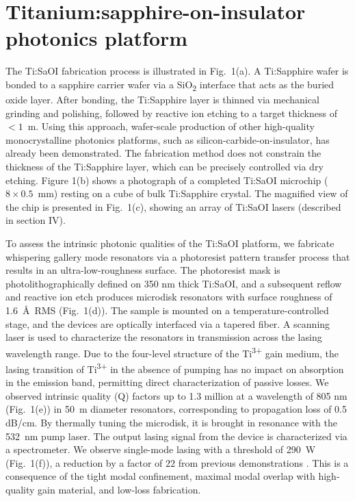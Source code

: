 \documentclass[amsmath, amsthm, amssymb, aps, prb, superscriptaddress, twocolumn, nofootinbib, 10pt]{revtex4-1}%
\begin{document}
\section{Titanium:sapphire-on-insulator photonics platform} 

The Ti:SaOI fabrication process is illustrated in Fig.~1(a). A Ti:Sapphire wafer is bonded to a sapphire carrier wafer via a SiO\textsubscript{2} interface that acts as the buried oxide layer. After bonding, the Ti:Sapphire layer is thinned via mechanical grinding and polishing, followed by reactive ion etching to a target thickness of $<1$~\textmu m. Using this approach, wafer-scale production of other high-quality monocrystalline photonics platforms, such as silicon-carbide-on-insulator\cite{lukin20204h}, has already been demonstrated. The fabrication method does not constrain the thickness of the Ti:Sapphire layer, which can be precisely controlled via dry etching. Figure 1(b) shows a photograph of a completed Ti:SaOI microchip ($8\times0.5$~mm) resting on a cube of bulk Ti:Sapphire crystal. The magnified view of the chip is presented in Fig.~1(c), showing an array of Ti:SaOI lasers (described in section IV).

To assess the intrinsic photonic qualities of the Ti:SaOI platform, we fabricate whispering gallery mode resonators via a photoresist pattern transfer process that results in an ultra-low-roughness surface. The photoresist mask is photolithographically defined on 350 nm thick Ti:SaOI, and a subsequent reflow and reactive ion etch produces microdisk resonators with surface roughness of 1.6~\AA~RMS (Fig.~1(d)). The sample is mounted on a temperature-controlled stage, and the devices are optically interfaced via a tapered fiber. A scanning laser is used to characterize the resonators in transmission across the lasing wavelength range. Due to the four-level structure of the Ti\textsuperscript{3+} gain medium, the lasing transition of Ti\textsuperscript{3+}  in the absence of pumping has no impact on absorption in the emission band, permitting direct characterization of passive losses. We observed intrinsic quality (Q) factors up to 1.3 million at a wavelength of 805 nm (Fig.~1(e)) in 50~\textmu m diameter resonators, corresponding to propagation loss of 0.5 dB/cm.  By thermally tuning the microdisk, it is brought in resonance with the 532~nm pump laser. The output lasing signal from the device is characterized via a spectrometer. We observe single-mode lasing with a threshold of 290~\textmu W (Fig.~1(f)), a reduction by a factor of $22$ from previous demonstrations \cite{wang2023photonic, azeem2022ultra}. This is a consequence of the tight modal confinement, maximal modal overlap with high-quality gain material, and low-loss fabrication.
\end{document}
